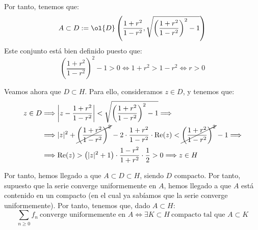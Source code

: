 \begin{ejercicio}
        Por tanto, tenemos que:
        \begin{equation*}
            A\subset D:=\ol{D}\left(\dfrac{1+r^2}{1-r^2},\sqrt{\left(\dfrac{1+r^2}{1-r^2}\right)^2-1}\right)
        \end{equation*}
        Este conjunto está bien definido puesto que:
        \begin{equation*}
            \left(\dfrac{1+r^2}{1-r^2}\right)^2-1>0\iff 1+r^2>1-r^2\iff r>0
        \end{equation*}

        Veamos ahora que $D\subset H$. Para ello, consideramos $z\in D$, y tenemos que:
        \begin{align*}
            z\in D &\Longrightarrow
            \left|z-\dfrac{1+r^2}{1-r^2}\right|<\sqrt{\left(\dfrac{1+r^2}{1-r^2}\right)^2-1}
            \Longrightarrow \\ &\Longrightarrow
            |z|^2+\cancel{\left(\dfrac{1+r^2}{1-r^2}\right)^2}-2\cdot \dfrac{1+r^2}{1-r^2}\cdot \Re(z)<\cancel{\left(\dfrac{1+r^2}{1-r^2}\right)^2}-1
            \Longrightarrow \\ &\Longrightarrow
            \Re(z)>\left(|z|^2+1\right)\cdot \dfrac{1-r^2}{1+r^2}\cdot \dfrac{1}{2}>0
            \Longrightarrow z\in H
        \end{align*}

        Por tanto, hemos llegado a que $A\subset D\subset H$, siendo $D$ compacto. Por tanto, supuesto que la serie converge uniformemente en $A$, hemos llegado a que $A$ está contenido en un compacto (en el cual ya sabíamos que la serie converge uniformemente). Por tanto, tenemos que, dado $A\subset H$:
        \begin{equation*}
            \sum_{n \geq 0} f_n\ \text{converge uniformemente en } A\iff \exists K\subset H\ \text{compacto tal que } A\subset K
        \end{equation*}


\end{ejercicio}